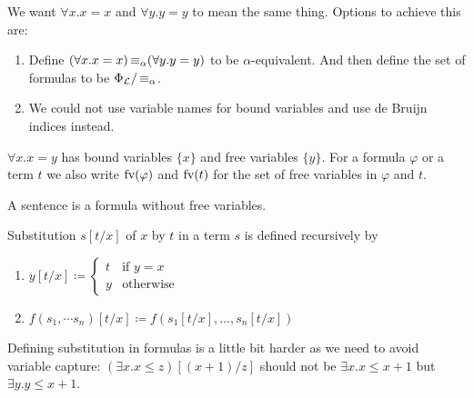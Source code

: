 \begin{rem}
We want $\forall x. x = x$ and $\forall y. y = y$ to mean the same thing. 
Options to achieve this are: 
\begin{enumerate}
    \item Define $(\forall x. x = x) \operatorname{\equiv_{\alpha}} (\forall y. y = y)$ to be \alert{$\alpha$-equivalent}. And then define the set of formulas to be $\Phi_{\mathcal{L}} / \operatorname{\equiv_{\alpha}}$.
    \item We could not use variable names for bound variables and use \alert{de Bruijn indices} instead.
\end{enumerate}
\end{rem}

\begin{rem}
    $\forall x. x = y$ has \alert{bound variables} $\{x\}$ and \alert{free variables} $\{y\}$. For a formula $\varphi$ or a term $t$ we also write \alert{$\text{fv}(\varphi)$} and \alert{$\text{fv}(t)$} for the set of free variables in $\varphi$ and $t$.
\end{rem}

\begin{defi}
    A \alert{sentence} is a formula without free variables.
\end{defi}

\begin{defi}
    \alert{Substitution $s[t/x]$} of $x$ by $t$ in a term $s$ is defined recursively by 
    \begin{enumerate}
        \item {$ y[t/x] \coloneq 
                \begin{cases}
                    t & \text{if } y = x \\
                    y & \text{otherwise}
                \end{cases}$}
        \item $f(s_1, \dotsm s_n)[t/x] \coloneq f(s_1[t/x], \dots, s_n[t/x])$
    \end{enumerate}
\end{defi}

\begin{example}
    Defining substitution in formulas is a little bit harder as we need to avoid \alert{variable capture}:
    $(\exists x. x \leq z)[(x + 1)/z]$ should not be $\exists x. x \leq x + 1$ but $\exists y. y \leq x + 1$.
\end{example}

